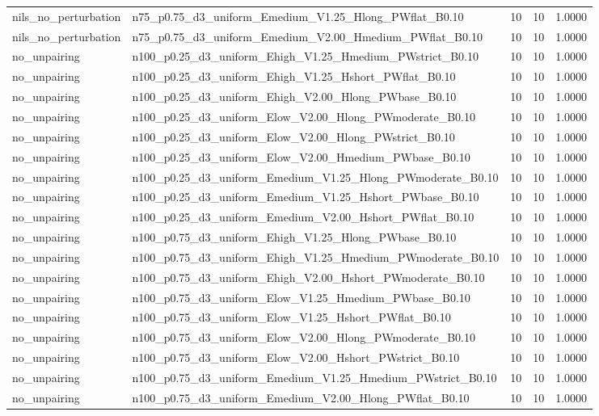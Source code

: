 \begin{tabular}{llrrr}
nils_no_perturbation & n75_p0.75_d3_uniform_Emedium_V1.25_Hlong_PWflat_B0.10 & 10 & 10 & 1.0000 \\
nils_no_perturbation & n75_p0.75_d3_uniform_Emedium_V2.00_Hmedium_PWflat_B0.10 & 10 & 10 & 1.0000 \\
no_unpairing & n100_p0.25_d3_uniform_Ehigh_V1.25_Hmedium_PWstrict_B0.10 & 10 & 10 & 1.0000 \\
no_unpairing & n100_p0.25_d3_uniform_Ehigh_V1.25_Hshort_PWflat_B0.10 & 10 & 10 & 1.0000 \\
no_unpairing & n100_p0.25_d3_uniform_Ehigh_V2.00_Hlong_PWbase_B0.10 & 10 & 10 & 1.0000 \\
no_unpairing & n100_p0.25_d3_uniform_Elow_V2.00_Hlong_PWmoderate_B0.10 & 10 & 10 & 1.0000 \\
no_unpairing & n100_p0.25_d3_uniform_Elow_V2.00_Hlong_PWstrict_B0.10 & 10 & 10 & 1.0000 \\
no_unpairing & n100_p0.25_d3_uniform_Elow_V2.00_Hmedium_PWbase_B0.10 & 10 & 10 & 1.0000 \\
no_unpairing & n100_p0.25_d3_uniform_Emedium_V1.25_Hlong_PWmoderate_B0.10 & 10 & 10 & 1.0000 \\
no_unpairing & n100_p0.25_d3_uniform_Emedium_V1.25_Hshort_PWbase_B0.10 & 10 & 10 & 1.0000 \\
no_unpairing & n100_p0.25_d3_uniform_Emedium_V2.00_Hshort_PWflat_B0.10 & 10 & 10 & 1.0000 \\
no_unpairing & n100_p0.75_d3_uniform_Ehigh_V1.25_Hlong_PWbase_B0.10 & 10 & 10 & 1.0000 \\
no_unpairing & n100_p0.75_d3_uniform_Ehigh_V1.25_Hmedium_PWmoderate_B0.10 & 10 & 10 & 1.0000 \\
no_unpairing & n100_p0.75_d3_uniform_Ehigh_V2.00_Hshort_PWmoderate_B0.10 & 10 & 10 & 1.0000 \\
no_unpairing & n100_p0.75_d3_uniform_Elow_V1.25_Hmedium_PWbase_B0.10 & 10 & 10 & 1.0000 \\
no_unpairing & n100_p0.75_d3_uniform_Elow_V1.25_Hshort_PWflat_B0.10 & 10 & 10 & 1.0000 \\
no_unpairing & n100_p0.75_d3_uniform_Elow_V2.00_Hlong_PWmoderate_B0.10 & 10 & 10 & 1.0000 \\
no_unpairing & n100_p0.75_d3_uniform_Elow_V2.00_Hshort_PWstrict_B0.10 & 10 & 10 & 1.0000 \\
no_unpairing & n100_p0.75_d3_uniform_Emedium_V1.25_Hmedium_PWstrict_B0.10 & 10 & 10 & 1.0000 \\
no_unpairing & n100_p0.75_d3_uniform_Emedium_V2.00_Hlong_PWflat_B0.10 & 10 & 10 & 1.0000 \\

\end{tabular}
